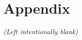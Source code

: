 \documentclass[conference]{IEEEtran}
\begin{document}
% 
% 
% 
% 
% 


%
%





\section*{Appendix}\label{appendix}

\textit{(Left intentionally blank)}
\end{document}
